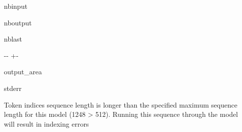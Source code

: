 \documentclass[letterpaper,10pt,english]{sphinxmanual}
\newlength\nbsphinxcodecellspacing
\begin{document}
\begin{sphinxuseclass}{nbinput}
{
\begin{sphinxVerbatim}[commandchars=\\\{\}]
\llap{\color{nbsphinxin}[56]:\,\hspace{\fboxrule}\hspace{\fboxsep}}   
   
\end{sphinxVerbatim}
}

\end{sphinxuseclass}
\begin{sphinxuseclass}{nboutput}
\begin{sphinxuseclass}{nblast}
{

\kern-\sphinxverbatimsmallskipamount\kern-\baselineskip
\kern+\FrameHeightAdjust\kern-\fboxrule
\vspace{\nbsphinxcodecellspacing}

\begin{sphinxuseclass}{output_area}
\begin{sphinxuseclass}{stderr}


\begin{sphinxVerbatim}[commandchars=\\\{\}]
Token indices sequence length is longer than the specified maximum sequence length for this model (1248 > 512). Running this sequence through the model will result in indexing errors
\end{sphinxVerbatim}



\end{sphinxuseclass}
\end{sphinxuseclass}
}

\end{sphinxuseclass}
\end{sphinxuseclass}
\end{document}
